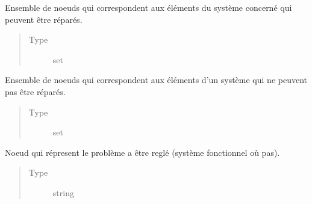 \documentclass[letterpaper,10pt,french]{sphinxmanual}
\begin{document}
\begin{fulllineitems}
\begin{fulllineitems}
\label{\detokenize{index:DecisionTheoreticTroubleshooting.TroubleShootingProblem.repairable_nodes}}
Ensemble de noeuds qui correspondent aux éléments du
système concerné qui peuvent être réparés.
\begin{quote}\begin{description}
\item[{Type}] \leavevmode
set

\end{description}\end{quote}

\end{fulllineitems}


\begin{fulllineitems}
\label{\detokenize{index:DecisionTheoreticTroubleshooting.TroubleShootingProblem.unrepairable_nodes}}
Ensemble de noeuds qui correspondent aux éléments
d’un système qui ne peuvent pas être réparés.
\begin{quote}\begin{description}
\item[{Type}] \leavevmode
set

\end{description}\end{quote}

\end{fulllineitems}


\begin{fulllineitems}
\label{\detokenize{index:DecisionTheoreticTroubleshooting.TroubleShootingProblem.problem_defining_node}}
Noeud qui répresent le problème a être reglé
(système fonctionnel où pas).
\begin{quote}\begin{description}
\item[{Type}] \leavevmode
string


\end{description}
\end{quote}
\end{fulllineitems}
\end{fulllineitems}
\end{document}
